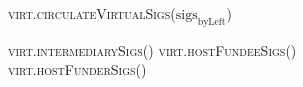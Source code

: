\begin{figure}[H]
  \begin{processbox}{\textsc{virt.circulateVirtualSigs}($\mathrm{sigs}_{\mathrm{byLeft}}$)}
    \begin{algorithmic}[1]
       
         
          \State \Return \textsc{virt.intermediarySigs}()
        \Else \: 
          \State \Return \textsc{virt.hostFundeeSigs}()
        \EndIf
      \Else \: 
        \State \Return \textsc{virt.hostFunderSigs}()
      \EndIf
    \end{algorithmic}
  \end{processbox}
  \caption{}
  \label{code:virtual-layer:virtual-sigs}
\end{figure}

